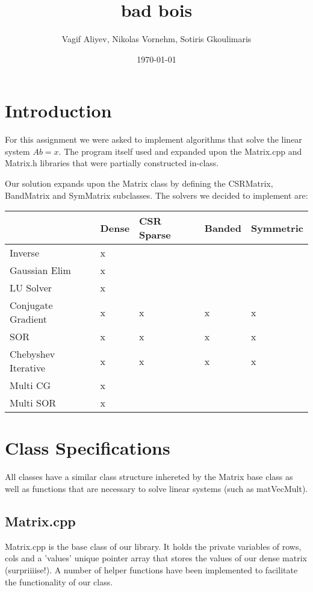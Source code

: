 \documentclass[11pt]{article}
\author{Vagif Aliyev, Nikolas Vornehm, Sotiris Gkoulimaris}
\date{\today}
\title{bad bois}
\begin{document}
\maketitle


\section{Introduction}
\label{sec:org63cfbbe}
For this assignment we were asked to implement algorithms that solve the linear
system \(A b = x\). The program itself used and expanded upon the Matrix.cpp and
Matrix.h libraries that were partially constructed in-class.

Our solution expands upon the Matrix class by defining the CSRMatrix, BandMatrix
and SymMatrix subclasses. The solvers we decided to implement are:

\begin{center}
\begin{tabular}{lllll}
 & Dense & CSR Sparse & Banded & Symmetric\\
\hline
Inverse & x &  &  & \\
Gaussian Elim & x &  &  & \\
LU Solver & x &  &  & \\
Conjugate Gradient & x & x & x & x\\
SOR & x & x & x & x\\
Chebyshev Iterative & x & x & x & x\\
Multi CG & x &  &  & \\
Multi SOR & x &  &  & \\
\end{tabular}
\end{center}


\section{Class Specifications}
\label{sec:orgcb9cdfc}

All classes have a similar class structure inhereted by the Matrix base class as
well as functions that are necessary to solve linear systems (such as
matVecMult).

\subsection{Matrix.cpp}
\label{sec:org44dcbfa}
Matrix.cpp is the base class of our library. It holds the private variables of
rows, cols and a 'values' unique pointer array that stores the values of our dense
matrix (surpriiiise!). A number of helper functions have been implemented to
facilitate the functionality of our class.
\end{document}
